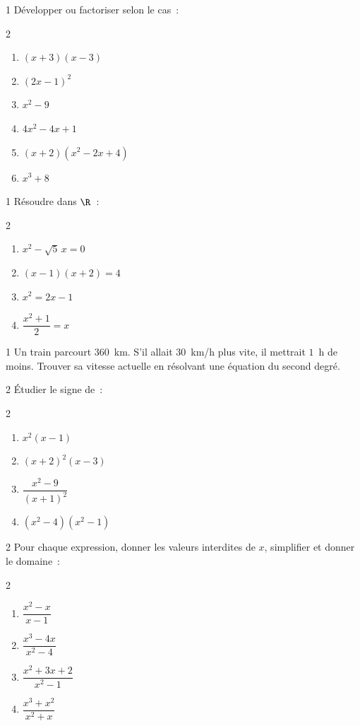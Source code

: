 \begin{exo}{1}
D\'evelopper ou factoriser selon le cas~:
\begin{multicols}{2}
\begin{enumerate}
  \item $(x+3)(x-3)$
  \item $(2x-1)^2$
  \item $x^2-9$
  \item $4x^2-4x+1$
  \item $(x+2)(x^2-2x+4)$
  \item $x^3+8$
\end{enumerate}
\end{multicols}
\end{exo}

\begin{exo}{1}
R\'esoudre dans $\R$~:
\begin{multicols}{2}
\begin{enumerate}
  \item $x^2 - \sqrt{5}\,x = 0$
  \item $(x-1)(x+2)=4$
  \item $x^2 = 2x - 1$
  \item $\dfrac{x^2+1}{2} = x$
\end{enumerate}
\end{multicols}
\end{exo}

\begin{exo}{1}
Un train parcourt $360$~km. S'il allait $30$~km/h plus vite, il mettrait
$1$~h de moins. Trouver sa vitesse actuelle en r\'esolvant une \'equation
du second degr\'e.
\end{exo}

\begin{exo}{2}
\'Etudier le signe de~:
\begin{multicols}{2}
\begin{enumerate}
  \item $x^2(x-1)$
  \item $(x+2)^2(x-3)$
  \item $\dfrac{x^2-9}{(x+1)^2}$
  \item $(x^2-4)(x^2-1)$
\end{enumerate}
\end{multicols}
\end{exo}

\begin{exo}{2}
Pour chaque expression, donner les valeurs interdites de $x$,
simplifier et donner le domaine~:
\begin{multicols}{2}
\begin{enumerate}
  \item $\dfrac{x^2-x}{x-1}$
  \item $\dfrac{x^3-4x}{x^2-4}$
  \item $\dfrac{x^2+3x+2}{x^2-1}$
  \item $\dfrac{x^3+x^2}{x^2+x}$
\end{enumerate}
\end{multicols}
\end{exo}

